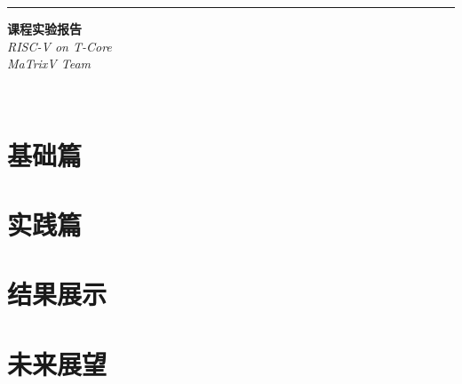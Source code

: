 \documentclass[a4paper, 11pt, oneside]{book} %
\numberwithin{equation}{subsection}
\begin{document}
	\begin{titlepage} %
		
		\raggedleft %
		
		\rule{1pt}{\textheight} %
		\hspace{0.05\textwidth} %
		\parbox[b]{0.75\textwidth}{ %
			
			{\Huge\bfseries  课程实验报告}\\[2\baselineskip] %
			{\LARGE\textit{RISC-V on T-Core}}\\[4\baselineskip] %
			{\Large\textit{MaTrixV Team}} %
			
			\vspace{0.5\textheight} %
			
			{\noindent }\\[\baselineskip] %
		}
	\end{titlepage}
	\tableofcontents
	\section{基础篇}
	\subsection{}
	\section{实践篇}
	
	\section{结果展示}
	
	\section{未来展望}
	
\end{document}

